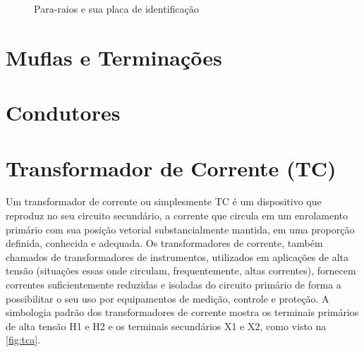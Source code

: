 \documentclass[a5paper,english,spanish,brazil]{ufsc-thesis}
\begin{document}
\begin{figure}[htb]
  \caption{Para-raios e sua placa de identificação}
  \centering
\end{figure}

\section{Muflas e Terminações}

\section{Condutores}

\section{Transformador de Corrente (TC)}
Um transformador de corrente ou simplesmente TC é um dispositivo que reproduz no seu circuito secundário, a corrente que circula em um enrolamento primário com sua posição vetorial substancialmente mantida, em uma proporção definida, conhecida e adequada. Os transformadores de corrente, também chamados de transformadores de instrumentos, utilizados em aplicações de alta tensão (situações essas onde circulam, frequentemente, altas correntes), fornecem correntes suficientemente reduzidas e isoladas do circuito primário de forma a possibilitar o seu uso por equipamentos de medição, controle e proteção. A simbologia padrão dos transformadores de corrente mostra os terminais primários de alta tensão H1 e H2 e os terminais secundários X1 e X2, como visto na \autoref{fig:tca}.
\end{document}
